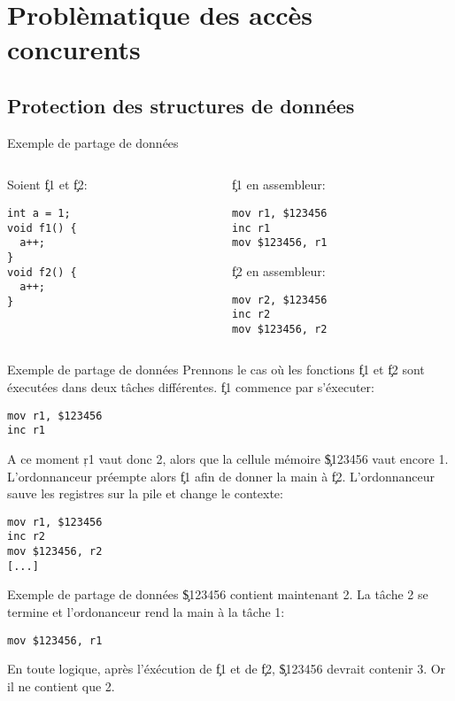 \section{Problèmatique des accès concurents}

\subsection{Protection des structures de données}

\begin{frame}[fragile]{Exemple de partage de données}
  \begin{columns}
    \begin{column}{5cm}
      Soient \c{f1} et \c{f2}:
      \begin{lstlisting}
int a = 1;
void f1() {
  a++;
}
void f2() {
  a++;
}
       \end{lstlisting}
     \end{column}
     \begin{column}{5cm}
       \c{f1} en assembleur:
       \begin{lstlisting}
mov r1, $123456
inc r1
mov $123456, r1
       \end{lstlisting}
       \c{f2} en assembleur:
       \begin{lstlisting} 
mov r2, $123456
inc r2
mov $123456, r2
      \end{lstlisting}
    \end{column}
  \end{columns}
\end{frame} 

\begin{frame}[fragile]{Exemple de partage de données}
  Prennons le  cas où  les fonctions \c{f1}  et \c{f2}  sont éxecutées
  dans deux tâches différentes.  \c{f1} commence par s'éxecuter:
\begin{lstlisting} 
mov r1, $123456
inc r1
  \end{lstlisting} 
  A  ce  moment \c{r1}  vaut  donc 2,  alors  que  la cellule  mémoire
  \c{\$123456}  vaut encore 1.   L'ordonnanceur préempte  alors \c{f1}
  afin de donner la main à \c{f2}.  L'ordonnanceur sauve les registres
  sur la pile et change le contexte:
\begin{lstlisting} 
mov r1, $123456
inc r2
mov $123456, r2
[...]
  \end{lstlisting} 
\end{frame}

\begin{frame}[fragile]{Exemple de partage de données}
  \c{\$123456}  contient  maintenant 2.   La  tâche  2  se termine  et
  l'ordonanceur rend la main à la tâche 1:
  \begin{lstlisting} 
mov $123456, r1
  \end{lstlisting} 
  En  toute  logique,  après  l'éxécution  de  \c{f1}  et  de  \c{f2},
  \c{\$123456} devrait contenir 3. Or il ne contient que 2.
\end{frame} 


